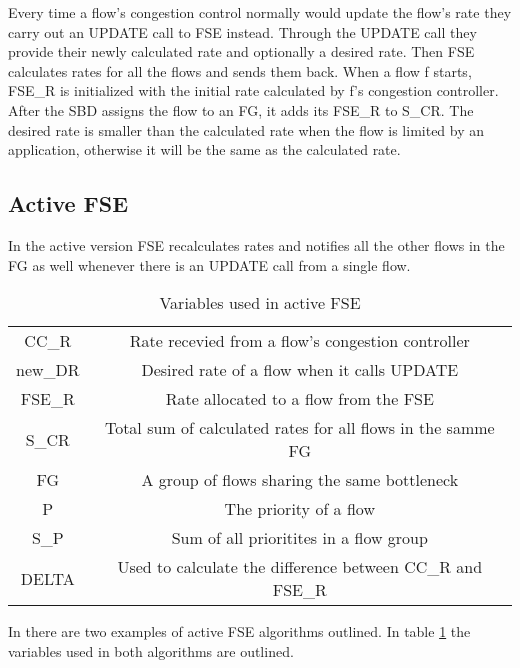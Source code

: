 Every time a flow's congestion control normally would update the flow's rate they carry out an UPDATE call to FSE instead. 
Through the UPDATE call they provide their newly calculated rate and optionally a desired rate. 
Then FSE calculates rates for all the flows and sends them back. 
When a flow f starts, FSE\_R is initialized with the initial rate calculated by f's congestion controller. 
After the SBD assigns the flow to an FG, it adds its FSE\_R to S\_CR.
The desired rate is smaller than the calculated rate when the flow is limited by an application, otherwise it will be the same as the calculated rate.

\subsection{Active FSE}
In the active version FSE recalculates rates and notifies all the other flows in the FG as well whenever there is an UPDATE call from a single flow. 

\begin{table}
\begin{center}
    \begin{tabular}{|c|c|}
        \hline
        CC\_R & Rate recevied from a flow's congestion controller \\
        new\_DR & Desired rate of a flow when it calls UPDATE \\
        FSE\_R & Rate allocated to a flow from the FSE \\
        S\_CR & Total sum of calculated rates for all flows in the samme FG \\ 
        FG & A group of flows sharing the same bottleneck \\
        P & The priority of a flow \\
        S\_P & Sum of all prioritites in a flow group \\
        DELTA & Used to calculate the difference between CC\_R and FSE\_R \\  
        \hline
    \end{tabular}
\end{center}
\caption{Variables used in active FSE}
\label{active_fse_variables}
\end{table}

In \cite{rfc8699} there are two examples of active FSE algorithms outlined.
In table \ref{active_fse_variables} the variables used in both algorithms are outlined. 

